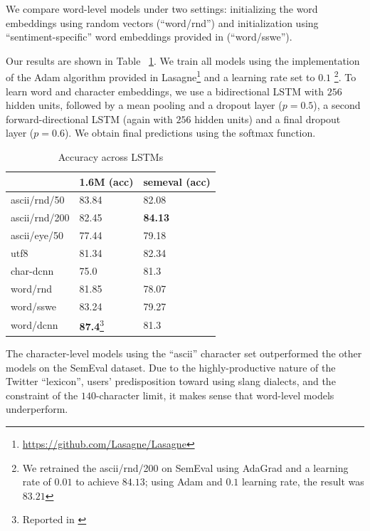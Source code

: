 \documentclass{article} %
\begin{document}
We compare word-level models under two settings: initializing the word embeddings using random vectors (``word/rnd'') and initialization using ``sentiment-specific'' word embeddings provided in \cite{tang2014learning} (``word/sswe'').

Our results are shown in Table ~\ref{table:results}. We train all models using the implementation of the Adam algorithm \cite{kingma2014adam} provided in Lasagne\footnote{\url{https://github.com/Lasagne/Lasagne}} and a learning rate set to $0.1$ \footnote{We retrained the ascii/rnd/200 on SemEval using AdaGrad and a learning rate of $0.01$ to achieve $84.13$; using Adam and $0.1$ learning rate, the result was $83.21$}. To learn word and character embeddings, we use a bidirectional LSTM with $256$ hidden units, followed by a mean pooling and a dropout layer ($p=0.5$), a second forward-directional LSTM (again with $256$ hidden units) and a final dropout layer ($p=0.6$). We obtain final predictions using the softmax function.

\begin{table}[h!]
\centering
\caption{Accuracy across LSTMs}
\begin{tabular}{|l|ll|}
\hline
              & 1.6M (acc)          & semeval (acc) \\
\hline
ascii/rnd/50  & 83.84          & 82.08            \\
ascii/rnd/200 & 82.45          & \textbf{84.13}   \\
ascii/eye/50  & 77.44          & 79.18   \\
utf8          & 81.34          & 82.34   \\
char-dcnn     & 75.0           & 81.3    \\
word/rnd      & 81.85          & 78.07   \\
word/sswe     & 83.24          & 79.27   \\
word/dcnn     & \textbf{87.4}\footnote{Reported in \cite{kalchbrenner2014convolutional}}           & 81.3    \\
\hline
\end{tabular}
\label{table:results}
\end{table}

The character-level models using the ``ascii'' character set outperformed the other models on the SemEval dataset. Due to the highly-productive nature of the Twitter ``lexicon'', users' predisposition toward using slang dialects, and the constraint of the $140$-character limit, it makes sense that word-level models underperform.
\end{document}
